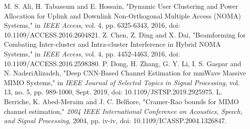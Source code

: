 \documentclass[journal]{IEEEtran}
\begin{document}
\begin{thebibliography}{00}
M. S. Ali, H. Tabassum and E. Hossain, "Dynamic User Clustering and Power Allocation for Uplink and Downlink Non-Orthogonal Multiple Access (NOMA) Systems," in \textit{IEEE Access}, vol. 4, pp. 6325-6343, 2016, doi: 10.1109/ACCESS.2016.2604821.
Z. Chen, Z. Ding and X. Dai, "Beamforming for Combating Inter-cluster and Intra-cluster Interference in Hybrid NOMA Systems," in \textit{IEEE Access}, vol. 4, pp. 4452-4463, 2016, doi: 10.1109/ACCESS.2016.2598380.
P. Dong, H. Zhang, G. Y. Li, I. S. Gaspar and N. NaderiAlizadeh, "Deep CNN-Based Channel Estimation for mmWave Massive MIMO Systems," in \textit{ IEEE Journal of Selected Topics in Signal Processing}, vol. 13, no. 5, pp. 989-1000, Sept. 2019, doi: 10.1109/JSTSP.2019.2925975.
L. Berriche, K. Abed-Meraim and J. C. Belfiore, "Cramer-Rao bounds for MIMO channel estimation," \textit{2004 IEEE International Conference on Acoustics, Speech, and Signal Processing}, 2004, pp. iv-iv, doi: 10.1109/ICASSP.2004.1326847.

\end{thebibliography}
\end{document}
